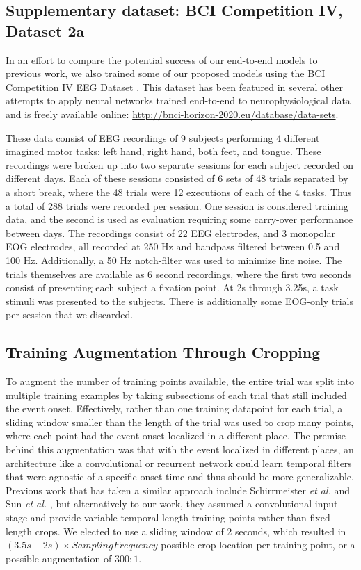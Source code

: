 \documentclass[fleqn,10pt]{wlscirep}
\begin{document}
\subsection*{Supplementary dataset: BCI Competition IV, Dataset 2a}

In an effort to compare the potential success of our end-to-end models to previous work, we also trained some of our proposed models using the BCI Competition IV EEG Dataset \cite{Tangermann2012}. This dataset has been featured in several other attempts to apply neural networks trained end-to-end to neurophysiological data \cite{Schirrmeister2017,Tabar2017,Lawhern2017,Sun} and is freely available online: \url{http://bnci-horizon-2020.eu/database/data-sets}.

These data consist of EEG recordings of 9 subjects performing 4 different imagined motor tasks: left hand, right hand, both feet, and tongue. These recordings were broken up into two separate sessions for each subject recorded on different days. Each of these sessions consisted of 6 sets of 48 trials separated by a short break, where the 48 trials were 12 executions of each of the 4 tasks. Thus a total of 288 trials were recorded per session. One session is considered training data, and the second is used as evaluation requiring some carry-over performance between days. The recordings consist of 22 EEG electrodes, and 3 monopolar EOG electrodes, all recorded at 250 Hz and bandpass filtered between 0.5 and 100 Hz. Additionally, a 50 Hz notch-filter was used to minimize line noise. The trials themselves are available as 6 second recordings, where the first two seconds consist of presenting each subject a fixation point. At 2s through 3.25s, a task stimuli was presented to the subjects. There is additionally some EOG-only trials per session that we discarded. 

\subsection*{Training Augmentation Through Cropping}

To augment the number of training points available, the entire trial was split into multiple training examples by taking subsections of each trial that still included the event onset. Effectively, rather than one training datapoint for each trial, a sliding window smaller than the length of the trial was used to crop many points, where each point had the event onset localized in a different place. The premise behind this augmentation was that with the event localized in different places, an architecture like a convolutional or recurrent network could learn temporal filters that were agnostic of a specific onset time and thus should be more generalizable. Previous work that has taken a similar approach include Schirrmeister {\em et al.} \cite{Schirrmeister2017} and Sun {\em et al.} \cite{Sun}, but alternatively to our work, they assumed a convolutional input stage and provide variable temporal length training points rather than fixed length crops. We elected to use a sliding window of 2 seconds, which resulted in $(3.5s-2s) \times SamplingFrequency$ possible crop location per training point, or a possible augmentation of $300:1$.
\end{document}
